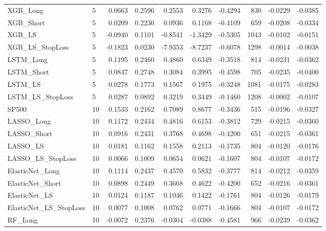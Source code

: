 \begin{tabular}{llrrrrrrrr}
\cline{1-10}
XGB\_Long & 5 & 0.0663 & 0.2596 & 0.2553 & 0.3276 & -0.4294 & 830 & -0.0229 & -0.0385 \\
\cline{1-10}
XGB\_Short & 5 & 0.0209 & 0.2230 & 0.0936 & 0.1168 & -0.4109 & 659 & -0.0208 & -0.0334 \\
\cline{1-10}
XGB\_LS & 5 & -0.0940 & 0.1101 & -0.8541 & -1.3429 & -0.5305 & 1043 & -0.0102 & -0.0151 \\
\cline{1-10}
XGB\_LS\_StopLoss & 5 & -0.1823 & 0.0230 & -7.9353 & -8.7237 & -0.6078 & 1298 & -0.0014 & -0.0038 \\
\cline{1-10}
LSTM\_Long & 5 & 0.1195 & 0.2460 & 0.4860 & 0.6349 & -0.3518 & 814 & -0.0231 & -0.0362 \\
\cline{1-10}
LSTM\_Short & 5 & 0.0847 & 0.2748 & 0.3084 & 0.3995 & -0.4598 & 705 & -0.0235 & -0.0400 \\
\cline{1-10}
LSTM\_LS & 5 & 0.0278 & 0.1773 & 0.1567 & 0.1975 & -0.3248 & 1081 & -0.0175 & -0.0283 \\
\cline{1-10}
LSTM\_LS\_StopLoss & 5 & 0.0287 & 0.0892 & 0.3219 & 0.3449 & -0.1460 & 1208 & -0.0002 & -0.0107 \\
\cline{1-10}
SP500 & 10 & 0.1533 & 0.2162 & 0.7089 & 0.8677 & -0.3436 & 515 & -0.0196 & -0.0327 \\
\cline{1-10}
LASSO\_Long & 10 & 0.1172 & 0.2434 & 0.4816 & 0.6153 & -0.3812 & 729 & -0.0215 & -0.0360 \\
\cline{1-10}
LASSO\_Short & 10 & 0.0916 & 0.2431 & 0.3768 & 0.4698 & -0.4200 & 651 & -0.0215 & -0.0361 \\
\cline{1-10}
LASSO\_LS & 10 & 0.0181 & 0.1162 & 0.1558 & 0.2113 & -0.1735 & 804 & -0.0120 & -0.0176 \\
\cline{1-10}
LASSO\_LS\_StopLoss & 10 & 0.0066 & 0.1009 & 0.0654 & 0.0621 & -0.1607 & 804 & -0.0107 & -0.0172 \\
\cline{1-10}
ElasticNet\_Long & 10 & 0.1114 & 0.2437 & 0.4570 & 0.5832 & -0.3777 & 814 & -0.0212 & -0.0359 \\
\cline{1-10}
ElasticNet\_Short & 10 & 0.0898 & 0.2449 & 0.3668 & 0.4622 & -0.4200 & 652 & -0.0216 & -0.0361 \\
\cline{1-10}
ElasticNet\_LS & 10 & 0.0124 & 0.1187 & 0.1046 & 0.1422 & -0.1761 & 804 & -0.0126 & -0.0179 \\
\cline{1-10}
ElasticNet\_LS\_StopLoss & 10 & 0.0077 & 0.1008 & 0.0762 & 0.0771 & -0.1666 & 804 & -0.0107 & -0.0172 \\
\cline{1-10}
RF\_Long & 10 & -0.0072 & 0.2376 & -0.0304 & -0.0388 & -0.4581 & 966 & -0.0239 & -0.0362 \\

\end{tabular}
